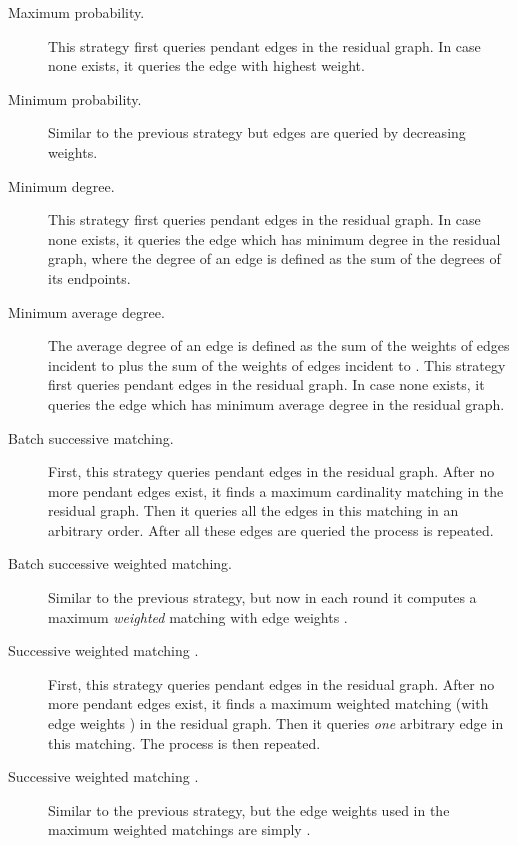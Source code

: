 \documentclass[12pt]{article}
\begin{document}
		\begin{description}
			\item[Maximum probability.] This strategy first queries pendant edges in the residual graph. In case none exists, it queries the edge with highest weight. 
			
			\item[Minimum probability.] Similar to the previous strategy but edges are queried by decreasing weights.
			
			\item[Minimum degree.] This strategy first queries pendant edges in the residual graph. In case none exists, it queries the edge which has minimum degree in the residual graph, where the degree of an edge is defined as the sum of the degrees of its endpoints.
			
			\item[Minimum average degree.] The average degree of an edge  is defined as the sum of the weights of edges incident to  plus the sum of the weights of edges incident to . This strategy first queries pendant edges in the residual graph. In case none exists, it queries the edge which has minimum average degree in the residual graph.  
			
			\item[Batch successive matching.] First, this strategy queries pendant edges in the residual graph. After no more pendant edges exist, it finds a maximum cardinality matching in the residual graph. Then it queries all the edges in this matching in an arbitrary order. After all these edges are queried the process is repeated.
			
			\item[Batch successive weighted matching.] Similar to the previous strategy, but now in each round it computes a maximum \emph{weighted} matching with edge weights . 
			
			\item[Successive weighted matching .] First, this strategy queries pendant edges in the residual graph. After no more pendant edges exist, it finds a maximum weighted matching (with edge weights ) in the residual graph. Then it queries \emph{one} arbitrary edge in this matching. The process is then repeated.
			
			\item[Successive weighted matching .] Similar to the previous strategy, but the edge weights used in the maximum weighted matchings are simply .
	\end{description}
	
\end{document}

